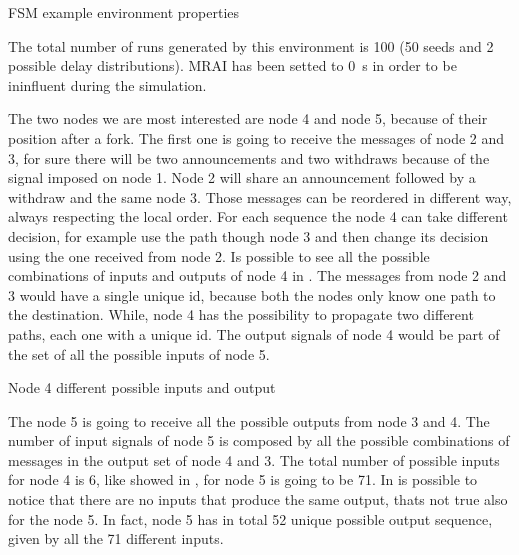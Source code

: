 \begin{table}[h]
	
	\caption{FSM example environment properties}
	\label{tbl:fig_4_example}
\end{table}

The total number of runs generated by this environment is \num{100} (\num{50} seeds
and \num{2} possible delay distributions).
\ac{MRAI} has been setted to \SI{0}{\second} in order to be ininfluent
during the simulation.

The two nodes we are most interested are node \num{4} and node \num{5}, because of their
position after a fork.
The first one is going to receive the messages of node \num{2} and \num{3}, for
sure there will be two announcements and two withdraws because of the signal
imposed on node 1.
Node \num{2} will share an announcement followed by a withdraw and the same node
\num{3}.
Those messages can be reordered in different way, always respecting the local
order.
For each sequence the node \num{4} can take different decision, for
example use the path though node \num{3} and then change its decision using the
one received from node \num{2}.
Is possible to see all the possible combinations of inputs and outputs of node
\num{4} in .
The messages from node \num{2} and \num{3} would have a single unique id, because
both the nodes only know one path to the destination.
While, node \num{4} has the possibility to propagate two different paths, each
one with a unique id.
The output signals of node \num{4} would be part of the set of all the possible
inputs of node \num{5}.

\begin{table}[h]
	
	\caption{Node 4 different possible inputs and output}
	\label{tbl:fig_4_node4_possible_inputs}
\end{table}

The node \num{5} is going to receive all the possible outputs from node \num{3} and
\num{4}.
The number of input signals of node \num{5} is composed by all the possible
combinations of messages in the output set of node \num{4} and \num{3}.
The total number of possible inputs for node \num{4} is \num{6}, like
showed in , for node \num{5} is going
to be \num{71}.
In  is possible to notice that
there are no inputs that produce the same output, thats not true also for
the node \num{5}.
In fact, node \num{5} has in total \num{52} unique possible output sequence,
given by all the \num{71} different inputs.

